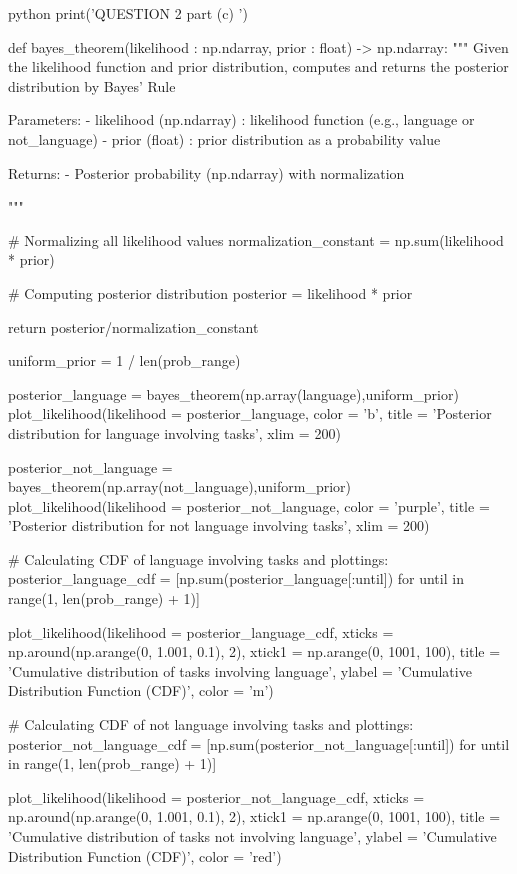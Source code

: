 \documentclass[12pt]{amsart}
\begin{document}
\begin{mintedbox}{python}
print('QUESTION 2 part (c) \n')

def bayes_theorem(likelihood : np.ndarray, prior : float) -> np.ndarray:
    """
    Given the likelihood function and prior distribution,
    computes and returns the posterior distribution by Bayes' Rule

        Parameters:
            - likelihood (np.ndarray) : likelihood function (e.g., language or not_language)
            - prior (float)           : prior distribution as a probability value 

        Returns:
            - Posterior probability (np.ndarray) with normalization

    """

    # Normalizing all likelihood values
    normalization_constant = np.sum(likelihood * prior)
    
    # Computing posterior distribution    
    posterior = likelihood * prior 

    return posterior/normalization_constant

uniform_prior = 1 / len(prob_range)

posterior_language = bayes_theorem(np.array(language),uniform_prior)
plot_likelihood(likelihood = posterior_language,
                color = 'b',
                title = 'Posterior distribution for language involving tasks',
                xlim = 200)

posterior_not_language = bayes_theorem(np.array(not_language),uniform_prior)
plot_likelihood(likelihood = posterior_not_language,
                color = 'purple',
                title = 'Posterior distribution for not language involving tasks',
                xlim = 200)


# Calculating CDF of language involving tasks and plottings:
posterior_language_cdf = [np.sum(posterior_language[:until]) for until in range(1, len(prob_range) + 1)]

plot_likelihood(likelihood = posterior_language_cdf,
                xticks     = np.around(np.arange(0, 1.001, 0.1), 2),
                xtick1     = np.arange(0, 1001, 100),
                title      = 'Cumulative distribution of tasks involving language',
                ylabel     = 'Cumulative Distribution Function (CDF)',
                color      = 'm')

# Calculating CDF of not language involving tasks and plottings:
posterior_not_language_cdf = [np.sum(posterior_not_language[:until]) for until in range(1, len(prob_range) + 1)]

plot_likelihood(likelihood = posterior_not_language_cdf,
                xticks     = np.around(np.arange(0, 1.001, 0.1), 2),
                xtick1     = np.arange(0, 1001, 100),
                title      = 'Cumulative distribution of tasks not involving language',
                ylabel     = 'Cumulative Distribution Function (CDF)',
                color      = 'red')


\end{mintedbox}
\end{document}
